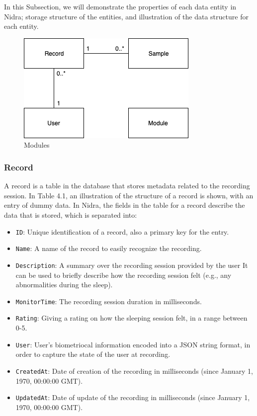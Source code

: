 In this Subsection, we will demonstrate the properties of each data entity in Nidra; storage structure of the entities, and illustration of the data structure for each entity.  

\begin{figure}
    \centering
    \includegraphics[scale=0.6]{images/DataEntries.png}
    \caption{Modules}
    \label{fig:dataentries}
\end{figure}

\subsubsection{Record} \label{ssec:record}

A record is a table in the database that stores metadata related to the recording session. In Table 4.1, an illustration of the structure of a record is shown, with an entry of dummy data. In Nidra, the fields in the table for a record describe the data that is stored, which is separated into:
\begin{itemize}
	\item \verb|ID|: Unique identification of a record, also a primary key for the entry.
	\item \verb|Name|: A name of the record to easily recognize the recording.
	\item \verb|Description|: A summary over the recording session provided by the user It can be used to briefly describe how the recording session felt (e.g., any abnormalities during the sleep).
	\item \verb|MonitorTime|: The recording session duration in milliseconds.
	\item \verb|Rating|: Giving a rating on how the sleeping session felt, in a range between 0-5. 
	\item \verb|User|: User's biometriocal information encoded into a JSON string format, in order to capture the state of the user at recording. 
	\item \verb|CreatedAt|: Date of creation of the recording in milliseconds (since January 1, 1970, 00:00:00 GMT).
	\item \verb|UpdatedAt|: Date of update of the recording in milliseconds (since January 1, 1970, 00:00:00 GMT).
\end{itemize}


